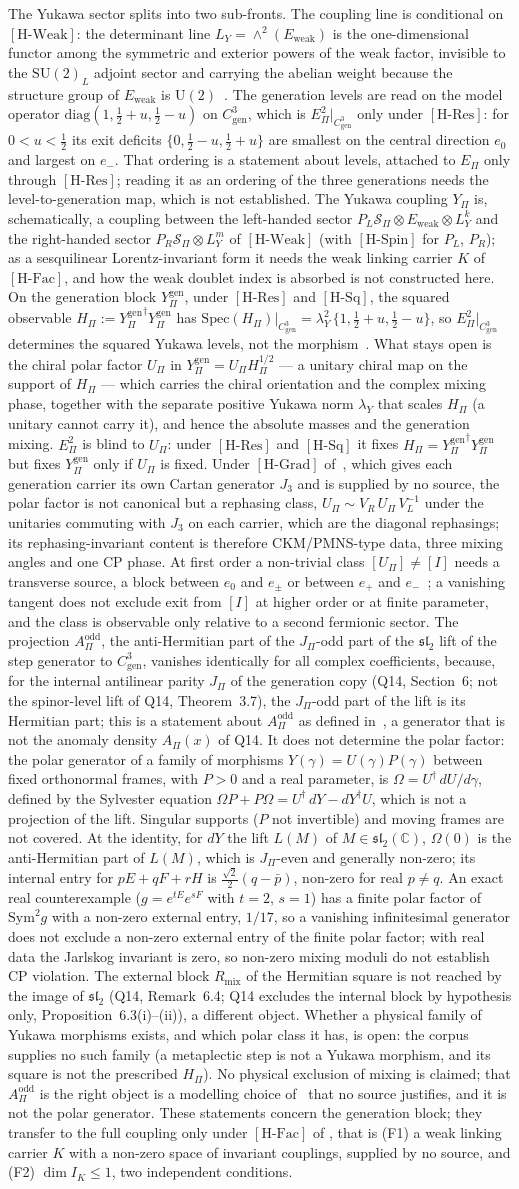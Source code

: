 \documentclass[11pt,a4paper]{article}
\theoremstyle{definition}
\newcommand{\SU}{\mathrm{SU}}
\newcommand{\UU}{\mathrm{U}}
\newcommand{\Sbundle}{\mathcal{S}_\Pi}
\newcommand{\Epi}{E_\Pi}
\newcommand{\Cgen}{C^3_{\mathrm{gen}}}
\newcommand{\Ew}{E_{\mathrm{weak}}}
\newcommand{\HSpin}{\ensuremath{[\mathrm{H\text{-}Spin}]}}
\newcommand{\HWeak}{\ensuremath{[\mathrm{H\text{-}Weak}]}}
\newcommand{\HRes}{\ensuremath{[\mathrm{H\text{-}Res}]}}
\newcommand{\HSq}{\ensuremath{[\mathrm{H\text{-}Sq}]}}
\newcommand{\HFac}{\ensuremath{[\mathrm{H\text{-}Fac}]}}
\newcommand{\Ypi}{Y_\Pi}
\newcommand{\Ygen}{{Y^{\mathrm{gen}}_\Pi}}
\newcommand{\HGrad}{\ensuremath{[\mathrm{H\text{-}Grad}]}}
\newcommand{\AOdd}{A_\Pi^{\mathrm{odd}}}
\newcommand{\AClause}{%
  The projection $\AOdd$, the anti-Hermitian part of the $J_\Pi$-odd part of the $\mathfrak{sl}_2$ lift of the step
  generator to $\Cgen$, vanishes identically for all complex coefficients, because, for the internal antilinear
  parity $J_\Pi$ of the generation copy (Q14, Section~6; not the spinor-level lift of Q14, Theorem~3.7), the
  $J_\Pi$-odd part of the lift is its Hermitian part; this is a statement about $\AOdd$ as defined
  in~\cite{Beau2026pyo}, a generator that is not the anomaly density $A_\Pi(x)$ of Q14.
  It does not determine the polar factor: the polar generator of a family of morphisms $Y(\gamma)=U(\gamma)P(\gamma)$
  between fixed orthonormal frames, with $P>0$ and a real parameter, is $\Omega=U^\dagger\,dU/d\gamma$, defined by the
  Sylvester equation $\Omega P+P\Omega=U^\dagger\,dY-dY^\dagger U$, which is not a projection of the lift.
  Singular supports ($P$ not invertible) and moving frames are not covered.
  At the identity, for $dY$ the lift $L(M)$ of $M\in\mathfrak{sl}_2(\mathbb{C})$, $\Omega(0)$ is the anti-Hermitian part
  of $L(M)$, which is $J_\Pi$-even and generally non-zero; its internal entry for $pE+qF+rH$ is
  $\tfrac{\sqrt2}{2}(q-\bar p)$, non-zero for real $p\neq q$.
  An exact real counterexample ($g=e^{tE}e^{sF}$ with $t=2$, $s=1$) has a finite polar factor of $\mathrm{Sym}^2 g$
  with a non-zero external entry, $1/17$, so a vanishing infinitesimal generator does not exclude a non-zero
  external entry of the finite polar factor; with real data the Jarlskog invariant is zero, so non-zero mixing
  moduli do not establish CP violation.
  The external block $R_{\mathrm{mix}}$ of the Hermitian square is not reached by the image of $\mathfrak{sl}_2$ (Q14,
  Remark~6.4; Q14 excludes the internal block by hypothesis only, Proposition~6.3(i)--(ii)), a different object.
  Whether a physical family of Yukawa morphisms exists, and which polar class it has, is open: the corpus supplies
  no such family (a metaplectic step is not a Yukawa morphism, and its square is not the prescribed $H_\Pi$).
  No physical exclusion of mixing is claimed; that $\AOdd$ is the right object is a modelling choice
  of~\cite{Beau2026pyo} that no source justifies, and it is not the polar generator.%
}
\begin{document}
    The Yukawa sector splits into two sub-fronts.
    The coupling line is conditional on \HWeak{}: the determinant line $L_Y = \wedge^2(\Ew)$ is the one-dimensional
    functor among the symmetric and exterior powers of the weak factor, invisible to the $\SU(2)_L$ adjoint sector and
    carrying the abelian weight because the structure group of $\Ew$ is $\UU(2)$~\cite{Beau2026pyl}.
    The generation levels are read on the model operator
    $\mathrm{diag}(1, \tfrac12 + u, \tfrac12 - u)$ on $\Cgen$, which is $\Epi^2|_{\Cgen}$ only under \HRes{}:
    for $0<u<\tfrac12$ its exit deficits
    $\{0, \tfrac12 - u, \tfrac12 + u\}$ are smallest on the central direction $e_0$ and largest on $e_-$.
    That ordering is a statement about levels, attached to $\Epi$ only through \HRes{}; reading it as an ordering of
    the three generations needs the level-to-generation map, which is not established.
    The Yukawa coupling $\Ypi$ is, schematically, a coupling between the left-handed sector
    $P_L \Sbundle \otimes \Ew \otimes L_Y^{k}$ and the right-handed sector $P_R \Sbundle \otimes L_Y^{m}$ of \HWeak{}
    (with \HSpin{} for $P_L$, $P_R$);
    as a sesquilinear Lorentz-invariant form it needs the weak linking carrier $K$ of \HFac{}, and how the weak
    doublet index is absorbed is not constructed here.
    On the generation block $\Ygen$, under \HRes{} and \HSq{}, the squared observable $H_\Pi := \Ygen^\dagger\Ygen$ has
    $\mathrm{Spec}(H_\Pi)|_{\Cgen} = \lambda_Y^2\,\{1, \tfrac12 + u, \tfrac12 - u\}$, so $\Epi^2|_{\Cgen}$ determines
    the squared Yukawa levels, not the morphism~\cite{Beau2026pyo}.
    What stays open is the chiral polar factor $U_\Pi$ in $\Ygen = U_\Pi H_\Pi^{1/2}$ --- a unitary chiral map on the
    support of $H_\Pi$ --- which carries the chiral orientation and the complex mixing phase, together with the separate
    positive Yukawa norm $\lambda_Y$ that scales $H_\Pi$ (a unitary cannot carry it), and hence the absolute masses and
    the generation mixing.
    $\Epi^2$ is blind to $U_\Pi$: under \HRes{} and \HSq{} it fixes $H_\Pi = \Ygen^\dagger\Ygen$ but fixes $\Ygen$
    only if $U_\Pi$ is fixed.
    Under \HGrad{} of~\cite{Beau2026pyo}, which gives each generation carrier its own Cartan generator $J_3$ and is
    supplied by no source, the polar factor is not canonical but a rephasing class,
    $U_\Pi \sim V_R\,U_\Pi\,V_L^{-1}$ under the unitaries commuting with $J_3$ on each carrier, which are the diagonal
    rephasings; its
    rephasing-invariant content is therefore CKM/PMNS-type data, three mixing angles and one CP phase.
    At first order a non-trivial class $[U_\Pi] \neq [I]$ needs a transverse source, a block between $e_0$ and
    $e_\pm$ or between $e_+$ and $e_-$~\cite{Beau2026pyo}; a vanishing tangent does not exclude exit from $[I]$ at
    higher order or at finite parameter, and the class is observable only relative to a second fermionic sector.
    \AClause{}
    These statements concern the generation block; they transfer to the full coupling only under \HFac{} of
    \cite{Beau2026pyo}, that is (F1) a weak linking carrier $K$ with a non-zero space of invariant couplings, supplied
    by no source, and (F2) $\dim I_K\leq1$, two independent conditions.
\end{document}

